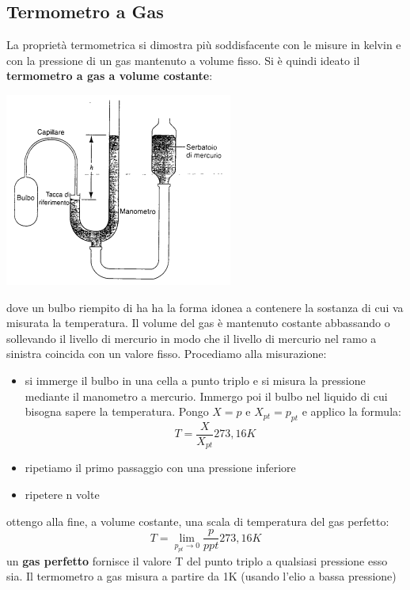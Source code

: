 \documentclass[a4paper,12pt, oneside]{book}
\begin{document}
\subsection{Termometro a Gas}
La proprietà termometrica si dimostra più soddisfacente con le misure in kelvin e con la pressione di un gas mantenuto a volume fisso. Si è quindi ideato il \textbf{termometro a gas a volume costante}:
\begin{center}
\includegraphics[scale=0.5]{img/term.png}
\end{center}
dove un bulbo riempito di ha ha la forma idonea a contenere la sostanza di cui va misurata la temperatura. Il volume del gas è mantenuto costante abbassando o sollevando il livello di mercurio in modo che il livello di mercurio nel ramo a sinistra coincida con un valore fisso. Procediamo alla misurazione:
\begin{itemize}
\item si immerge il bulbo in una cella a punto triplo e si misura la pressione mediante il manometro a mercurio. Immergo poi il bulbo nel liquido di cui bisogna sapere la temperatura. Pongo $X=p$ e $X_{pt}=p_{pt}$ e applico la formula:
$$T=\frac{X}{X_{pt}}273,16K$$
\item ripetiamo il primo passaggio con una pressione inferiore
\item ripetere n volte
\end{itemize}
ottengo alla fine, a volume costante, una scala di temperatura del gas perfetto:
$$T=\lim_{p_{pt}\to 0}\frac{p}{p{pt}}273,16K$$
un \textbf{gas perfetto} fornisce il valore T del punto triplo a qualsiasi pressione esso sia. Il termometro a gas misura a partire da 1K (usando l'elio a bassa pressione)
\end{document}
